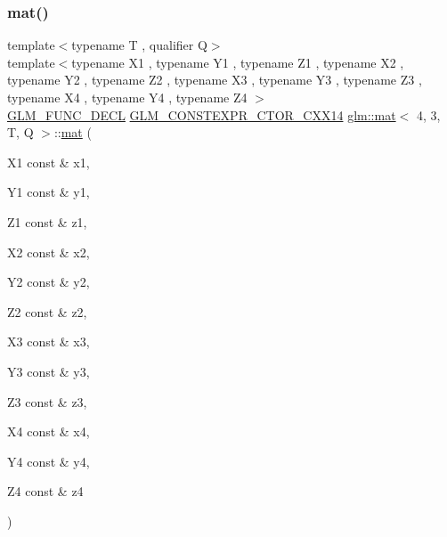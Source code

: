 \subsubsection{\texorpdfstring{mat()}{mat()}\hspace{0.1cm}{\footnotesize\ttfamily [7/21]}}
{\footnotesize\ttfamily template$<$typename T , qualifier Q$>$ \\
template$<$typename X1 , typename Y1 , typename Z1 , typename X2 , typename Y2 , typename Z2 , typename X3 , typename Y3 , typename Z3 , typename X4 , typename Y4 , typename Z4 $>$ \\
\mbox{\hyperlink{setup_8hpp_ab2d052de21a70539923e9bcbf6e83a51}{G\+L\+M\+\_\+\+F\+U\+N\+C\+\_\+\+D\+E\+CL}} \mbox{\hyperlink{setup_8hpp_a0900f9145e68bf6061b6f5e7be3fa751}{G\+L\+M\+\_\+\+C\+O\+N\+S\+T\+E\+X\+P\+R\+\_\+\+C\+T\+O\+R\+\_\+\+C\+X\+X14}} \mbox{\hyperlink{structglm_1_1mat}{glm\+::mat}}$<$ 4, 3, T, Q $>$\+::\mbox{\hyperlink{structglm_1_1mat}{mat}} (\begin{DoxyParamCaption}\item[{X1 const \&}]{x1,  }\item[{Y1 const \&}]{y1,  }\item[{Z1 const \&}]{z1,  }\item[{X2 const \&}]{x2,  }\item[{Y2 const \&}]{y2,  }\item[{Z2 const \&}]{z2,  }\item[{X3 const \&}]{x3,  }\item[{Y3 const \&}]{y3,  }\item[{Z3 const \&}]{z3,  }\item[{X4 const \&}]{x4,  }\item[{Y4 const \&}]{y4,  }\item[{Z4 const \&}]{z4 }\end{DoxyParamCaption})}

\mbox{\label{structglm_1_1mat_3_014_00_013_00_01_t_00_01_q_01_4_a066b9993b2c4aa5d755f83325b1e7870}} 
